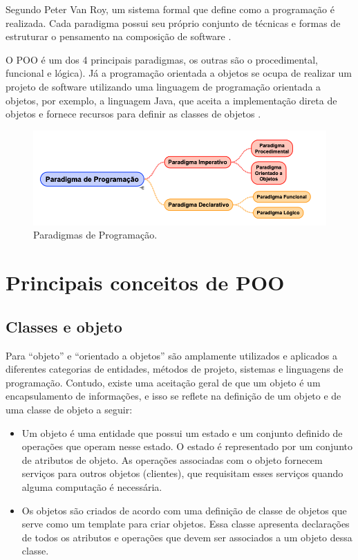 Segundo Peter Van Roy, um sistema formal que define como a programação é realizada. Cada paradigma possui seu próprio conjunto de técnicas e formas de estruturar o pensamento na composição de software \cite{vanroy2012}.

O POO é um dos 4 principais paradigmas, os outras são o procedimental, funcional e lógica). Já a programação orientada a objetos se ocupa de realizar um projeto de software utilizando uma linguagem de programação orientada a objetos, por exemplo, a linguagem Java, que aceita a implementação direta de objetos e fornece recursos para definir as classes de objetos \cite{sommerville2003engenharia}.

\begin{figure}[H]
	\centering
	\includegraphics[scale=0.5]{imagens/paradigmas.png}
	\caption{Paradigmas de Programação.}
	\label{fig:paradigmas}
\end{figure}

\section{Principais conceitos de POO}

\subsection{Classes e objeto}

Para \cite{sommerville2003engenharia} ``objeto'' e ``orientado a objetos'' são
amplamente utilizados e aplicados a diferentes categorias de entidades, métodos de
projeto, sistemas e linguagens de programação. Contudo, existe uma aceitação
geral de que um objeto é um encapsulamento de informações, e isso se reflete na
definição de um objeto e de uma classe de objeto a seguir:

\begin{itemize}
  \item Um objeto é uma entidade que possui um estado e um conjunto definido de
  operações que operam nesse estado. O estado é representado por um conjunto de
  atributos de objeto. As operações associadas com o objeto fornecem serviços para outros objetos (clientes), que requisitam esses serviços quando alguma computação é necessária.

  \item Os objetos são criados de acordo com uma definição de classe de objetos 
  que serve como um template para criar objetos. Essa classe apresenta 
  declarações de todos os atributos e operações que devem ser associados a um 
  objeto dessa classe.
\end{itemize}

